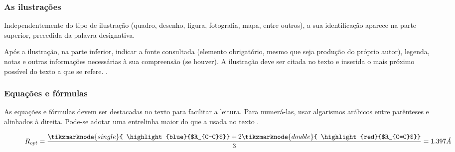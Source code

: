 \subsubsection{As ilustrações}

Independentemente do tipo de ilustração (quadro, desenho, figura, fotografia, mapa, entre outros), a sua identificação aparece na parte superior, precedida da palavra designativa. 

\begin{citacao}
	Após a ilustração, na parte inferior, indicar a fonte consultada (elemento obrigatório, mesmo que seja produção do próprio autor), legenda, notas e outras informações necessárias à sua compreensão (se houver). A ilustração deve ser citada no texto e inserida o mais próximo possível do texto a que se refere. \cite[p. 11]{NBR14724:2011}.
\end{citacao}

\subsubsection{Equações e fórmulas}

As equações e fórmulas devem ser destacadas no texto para facilitar a leitura.  Para numerá-las, usar algarismos arábicos entre parênteses e alinhados à direita. Pode-se adotar uma entrelinha maior do que a usada no texto \cite{NBR14724:2011}. \\


\begin{figure}[htb]
    \vspace{2\baselineskip}
\begin{equation}
    \label{cor}
    R_{opt} = \frac{ \tikzmarknode{single}{ \highlight{blue}{$R_{C-C}$}} + 2 \tikzmarknode{double}{ \highlight{red}{$R_{C=C}$}}}{3} = 1.397 \textit{\AA}
\end{equation}
\end{figure}

